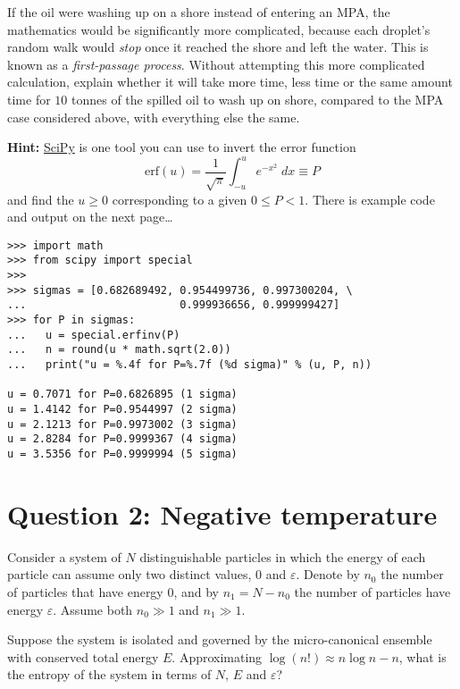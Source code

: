 \documentclass[12 pt]{article} %
\newcommand{\eps}{\ensuremath{\varepsilon} }
\newcommand{\showmarks}[1]{\rightline{\texttt{[#1 marks]}}} %
\begin{document}
\showmarks{8}

If the oil were washing up on a shore instead of entering an MPA, the mathematics would be significantly more complicated, because each droplet's random walk would \textit{stop} once it reached the shore and left the water.
This is known as a \textit{first-passage process}.
Without attempting this more complicated calculation, explain whether it will take more time, less time or the same amount time for $10$ tonnes of the spilled oil to wash up on shore, compared to the MPA case considered above, with everything else the same.

\showmarks{2}

\textbf{Hint:} \href{https://scipy.org}{SciPy} is one tool you can use to invert the error function
\begin{equation*}
  \mathrm{erf}(u) = \frac{1}{\sqrt{\pi}} \int_{-u}^u e^{-x^2} \; dx \equiv P
\end{equation*}
and find the $u \geq 0$ corresponding to a given $0 \leq P < 1$.
There is example code and output on the next page\dots
\newpage
\begin{verbatim}
>>> import math
>>> from scipy import special
>>>
>>> sigmas = [0.682689492, 0.954499736, 0.997300204, \
...                        0.999936656, 0.999999427]
>>> for P in sigmas:
...   u = special.erfinv(P)
...   n = round(u * math.sqrt(2.0))
...   print("u = %.4f for P=%.7f (%d sigma)" % (u, P, n))

u = 0.7071 for P=0.6826895 (1 sigma)
u = 1.4142 for P=0.9544997 (2 sigma)
u = 2.1213 for P=0.9973002 (3 sigma)
u = 2.8284 for P=0.9999367 (4 sigma)
u = 3.5356 for P=0.9999994 (5 sigma)
\end{verbatim}



\vfill
\section*{Question 2: Negative temperature}
Consider a system of $N$ distinguishable particles in which the energy of each particle can assume only two distinct values, $0$ and $\eps$.
Denote by $n_0$ the number of particles that have energy $0$, and by $n_1 = N - n_0$ the number of particles have energy $\eps$.
Assume both $n_0 \gg 1$ and $n_1 \gg 1$.

Suppose the system is isolated and governed by the micro-canonical ensemble with conserved total energy $E$.
Approximating $\log(n!) \approx n\log n - n$, what is the entropy of the system in terms of $N$, $E$ and $\eps$?
\end{document}
